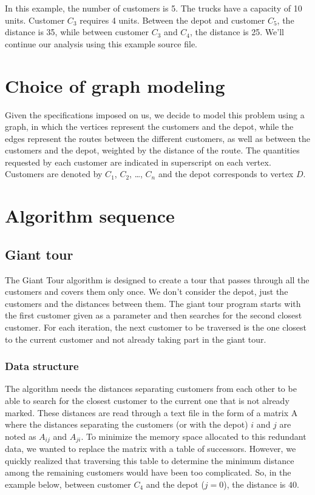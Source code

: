In this example, the number of customers is 5. The trucks have a capacity of 10 units. Customer $C_3$ requires 4 units. Between the depot and customer $C_5$, the distance is 35, while between customer $C_3$ and $C_4$, the distance is 25. We'll continue our analysis using this example source file.

\section{Choice of graph modeling}

Given the specifications imposed on us, we decide to model this problem using a graph, in which the vertices represent the customers and the depot, while the edges represent the routes between the different customers, as well as between the customers and the depot, weighted by the distance of the route. The quantities requested by each customer are indicated in superscript on each vertex. Customers are denoted by $C_1$, $C_2$, \ldots, $C_n$ and the depot corresponds to vertex $D$.

\section{Algorithm sequence}

\subsection{Giant tour}

The Giant Tour algorithm is designed to create a tour that passes through all the customers and covers them only once. We don't consider the depot, just the customers and the distances between them. The giant tour program starts with the first customer given as a parameter and then searches for the second closest customer. For each iteration, the next customer to be traversed is the one closest to the current customer and not already taking part in the giant tour.

\subsubsection{Data structure}

The algorithm needs the distances separating customers from each other to be able to search for the closest customer to the current one that is not already marked. These distances are read through a text file in the form of a matrix A where the distances separating the customers (or with the depot) $i$ and $j$ are noted as $A_{ij}$ and $A_{ji}$. To minimize the memory space allocated to this redundant data, we wanted to replace the matrix with a table of successors. However, we quickly realized that traversing this table to determine the minimum distance among the remaining customers would have been too complicated. So, in the example below, between customer $C_4$ and the depot ($j=0$), the distance is $40$.

